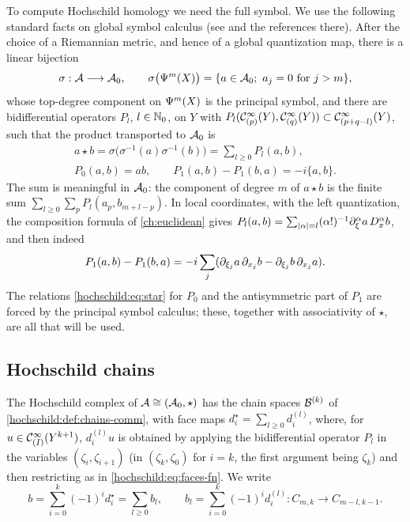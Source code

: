To compute Hochschild homology we need the full symbol. We use the following
standard facts on global symbol calculus (see \cite{Brylinski-Getzler} and the
references there). After the choice of a Riemannian metric, and hence of a
global quantization map, there is a linear bijection
\begin{equation*}
  \sigma:\mathcal{A}\longrightarrow\mathcal{A}_0,\qquad \sigma\bigl(\Psi^{m}(X)\bigr)=\{a\in\mathcal{A}_0;\ a_j=0\text{ for }j>m\},
\end{equation*}
whose top-degree component on $\Psi^{m}(X)$ is the principal symbol, and
there are bidifferential operators $P_l$, $l\in\mathbb{N}_0$, on $Y$ with
$P_l(\mathcal{C}^\infty_{(p)}(Y),\mathcal{C}^\infty_{(q)}(Y))\subset\mathcal{C}^\infty_{(p+q-l)}(Y)$, such that the
product transported to $\mathcal{A}_0$ is
\begin{equation}
\begin{gathered}
  a\star b=\sigma\bigl(\sigma^{-1}(a)\sigma^{-1}(b)\bigr)=\sum_{l\ge0}P_l(a,b),\\
  P_0(a,b)=ab,\qquad P_1(a,b)-P_1(b,a)=-i\{a,b\}.
\end{gathered}
  \label{hochschild:eq:star}
\end{equation}
The sum is meaningful in $\mathcal{A}_0$: the component of degree $m$ of $a\star b$ is
the finite sum $\sum_{l\ge0}\sum_pP_l(a_p,b_{m+l-p})$. In local coordinates,
with the left quantization, the composition formula of \cref{ch:euclidean}
gives $P_l(a,b)=\sum_{|\alpha|=l}(\alpha!)^{-1}\partial_\xi^\alpha a\,D_x^\alpha b$,
and then indeed
\begin{equation*}
  P_1(a,b)-P_1(b,a)=-i\sum_j(\partial_{\xi_j}a\,\partial_{x_j}b-\partial_{\xi_j}b\,\partial_{x_j}a).
\end{equation*}
The relations \eqref{hochschild:eq:star} for $P_0$ and the antisymmetric part
of $P_1$ are forced by the principal symbol calculus; these, together with
associativity of $\star$, are all that will be used.

\subsection{Hochschild chains}
\begin{definition}\label{hochschild:def:chains-full}
The Hochschild complex of $\mathcal{A}\cong(\mathcal{A}_0,\star)$ has the chain spaces
$\mathcal{B}^{(k)}$ of \cref{hochschild:def:chains-comm}, with face maps
$d_i^\star=\sum_{l\ge0}d_i^{(l)}$, where, for $u\in\mathcal{C}^\infty_{(I)}(Y^{k+1})$,
$d_i^{(l)}u$ is obtained by applying the bidifferential operator $P_l$ in the
variables $(\zeta_i,\zeta_{i+1})$ (in $(\zeta_k,\zeta_0)$ for $i=k$, the first
argument being $\zeta_k$) and then restricting as in
\eqref{hochschild:eq:faces-fn}. We write
\begin{equation*}
  b=\sum_{i=0}^k(-1)^id_i^\star=\sum_{l\ge0}b_l,\qquad
  b_l=\sum_{i=0}^k(-1)^id_i^{(l)}:C_{m,k}\longrightarrow C_{m-l,k-1}.
\end{equation*}
\end{definition}

